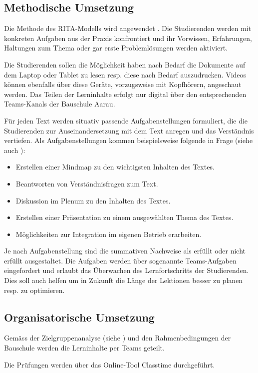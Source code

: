 \documentclass[
11pt,
captions=tableheading,
smallheadings,
headsepline,
footsepline, 
captions=tableheading,
parskip=half-,
]{scrartcl}
\begin{document}
\subsection{Methodische Umsetzung}
Die Methode des RITA-Modells wird angewendet \cite{BerufspädagogischesKonzept_BauschuleAarau}.
Die Studierenden werden mit konkreten Aufgaben aus der Praxis konfrontiert und ihr Vorwissen, Erfahrungen, Haltungen zum Thema oder gar erste Problemlösungen werden aktiviert.

Die Studierenden sollen die Möglichkeit haben nach Bedarf die Dokumente auf dem Laptop oder Tablet zu lesen resp. diese nach Bedarf auszudrucken. 
Videos können ebenfalls über diese Geräte, vorzugsweise mit Kopfhörern, angeschaut werden.
Das Teilen der Lerninhalte erfolgt nur digital über den entsprechenden Teams-Kanals der Bauschule Aarau.

Für jeden Text werden situativ passende Aufgabenstellungen formuliert, die die Studierenden zur Auseinandersetzung mit dem Text anregen und das Verständnis vertiefen. 
Als Aufgabenstellungen kommen beispielsweise folgende in Frage (siehe auch \cite{unikoelnMethodenpool}):
\begin{itemize}
    \item Erstellen einer Mindmap zu den wichtigsten Inhalten des Textes.
    \item Beantworten von Verständnisfragen zum Text.
    \item Diskussion im Plenum zu den Inhalten des Textes.
    \item Erstellen einer Präsentation zu einem ausgewählten Thema des Textes.
    \item Möglichkeiten zur Integration im eigenen Betrieb erarbeiten. 
\end{itemize}
Je nach Aufgabenstellung sind die summativen Nachweise als erfüllt oder nicht erfüllt ausgestaltet.
Die Aufgaben werden über sogenannte Teams-Aufgaben eingefordert und erlaubt das Überwachen des Lernfortschritts der Studierenden. 
Dies soll auch helfen um in Zukunft die Länge der Lektionen besser zu planen resp. zu optimieren.


\subsection{Organisatorische Umsetzung}
Gemäss der Zielgruppenanalyse (siehe ) und den Rahmenbedingungen der Bauschule werden die Lerninhalte per Teams geteilt.

Die Prüfungen werden über das Online-Tool Classtime durchgeführt.
\end{document}
